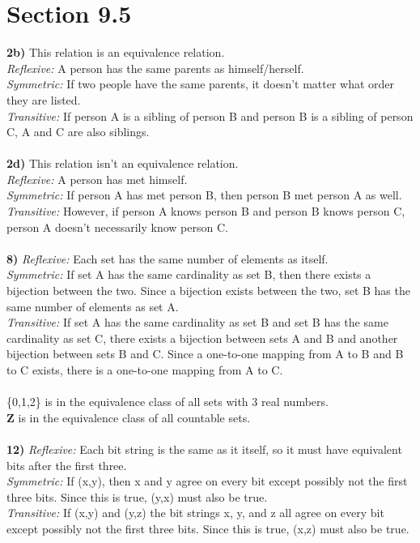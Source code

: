 \documentclass{article}
\begin{document}
\section*{Section 9.5}
\textbf{2b)} This relation is an equivalence relation. \\ \textit{Reflexive:} A person has the same parents as himself/herself. \\ \textit{Symmetric:} If two people have the same parents, it doesn't matter what order they are listed. \\ \textit{Transitive:} If person A is a sibling of person B and person B is a sibling of person C, A and C are also siblings.
\\\\
\textbf{2d)} This relation isn't an equivalence relation. \\ \textit{Reflexive:} A person has met himself. \\ \textit{Symmetric:} If person A has met person B, then person B met person A as well. \\ \textit{Transitive:} However, if person A knows person B and person B knows person C, person A doesn't necessarily know person C.
\\\\
\textbf{8)} \textit{Reflexive:} Each set has the same number of elements as itself. \\ \textit{Symmetric:} If set A has the same cardinality as set B, then there exists a bijection between the two. Since a bijection exists between the two, set B has the same number of elements as set A. \\ \textit{Transitive:} If set A has the same cardinality as set B and set B has the same cardinality as set C, there exists a bijection between sets A and B and another bijection between sets B and C. Since a one-to-one mapping from A to B and B to C exists, there is a one-to-one mapping from A to C. \\\\ \{0,1,2\} is in the equivalence class of all sets with 3 real numbers. \\ \textbf{Z} is in the equivalence class of all countable sets.
\\\\
\textbf{12)} \textit{Reflexive:} Each bit string is the same as it itself, so it must have equivalent bits after the first three. \\ \textit{Symmetric:} If (x,y), then x and y agree on every bit except possibly not the first three bits. Since this is true, (y,x) must also be true. \\ \textit{Transitive:} If (x,y) and (y,z) the bit strings x, y, and z all agree on every bit except possibly not the first three bits. Since this is true, (x,z) must also be true.
\end{document}
